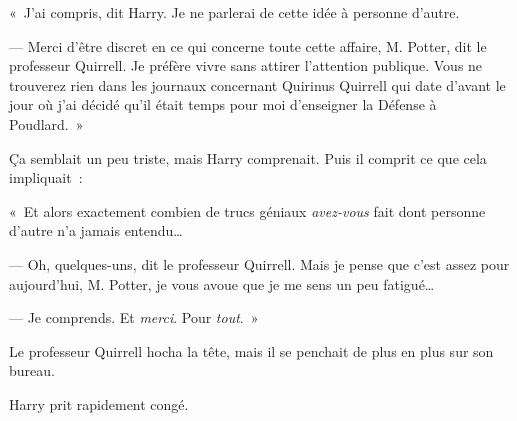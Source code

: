 «~J'ai compris, dit Harry.
Je ne parlerai de cette idée à personne d'autre.

--- Merci d'être discret en ce qui concerne toute cette affaire, M. Potter, dit le professeur Quirrell.
Je préfère vivre sans attirer l'attention publique.
Vous ne trouverez rien dans les journaux concernant Quirinus Quirrell qui date d'avant le jour où j'ai décidé qu'il était temps pour moi d'enseigner la Défense à Poudlard.~»

Ça semblait un peu triste, mais Harry comprenait.
Puis il comprit ce que cela impliquait~:

«~Et alors exactement combien de trucs géniaux \emph{avez-vous} fait dont personne d'autre n'a jamais entendu…

--- Oh, quelques-uns, dit le professeur Quirrell.
Mais je pense que c'est assez pour aujourd'hui, M. Potter, je vous avoue que je me sens un peu fatigué…

--- Je comprends.
Et \emph{merci}.
Pour \emph{tout}.~»

Le professeur Quirrell hocha la tête, mais il se penchait de plus en plus sur son bureau.

Harry prit rapidement congé.~
